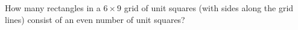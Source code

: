 How many rectangles in a $6\times9$ grid of unit squares (with sides along the grid lines) consist of an even number of unit squares?
